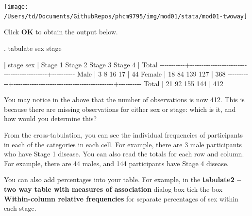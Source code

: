 \documentclass[
]{memoir}
\newenvironment{Shaded}{\begin{snugshade}}{\end{snugshade}}
\newcommand{\NormalTok}[1]{#1}
\begin{document}
\texttt{[image: /Users/td/Documents/GithubRepos/phcm9795/img/mod01/stata/mod01-twoway]}

Click \textbf{OK} to obtain the output below.

\begin{Shaded}
\begin{Highlighting}[]
\NormalTok{. tabulate sex stage}

\NormalTok{           |                    stage}
\NormalTok{       sex |   Stage 1    Stage 2    Stage 3    Stage 4 |     Total}
\NormalTok{{-}{-}{-}{-}{-}{-}{-}{-}{-}{-}{-}+{-}{-}{-}{-}{-}{-}{-}{-}{-}{-}{-}{-}{-}{-}{-}{-}{-}{-}{-}{-}{-}{-}{-}{-}{-}{-}{-}{-}{-}{-}{-}{-}{-}{-}{-}{-}{-}{-}{-}{-}{-}{-}{-}{-}+{-}{-}{-}{-}{-}{-}{-}{-}{-}{-}}
\NormalTok{      Male |         3          8         16         17 |        44 }
\NormalTok{    Female |        18         84        139        127 |       368 }
\NormalTok{{-}{-}{-}{-}{-}{-}{-}{-}{-}{-}{-}+{-}{-}{-}{-}{-}{-}{-}{-}{-}{-}{-}{-}{-}{-}{-}{-}{-}{-}{-}{-}{-}{-}{-}{-}{-}{-}{-}{-}{-}{-}{-}{-}{-}{-}{-}{-}{-}{-}{-}{-}{-}{-}{-}{-}+{-}{-}{-}{-}{-}{-}{-}{-}{-}{-}}
\NormalTok{     Total |        21         92        155        144 |       412 }
\end{Highlighting}
\end{Shaded}

You may notice in the above that the number of observations is now 412. This is because there are missing observations for either sex or stage: which is it, and how would you determine this?

From the cross-tabulation, you can see the individual frequencies of participants in each of the categories in each cell. For example, there are 3 male participants who have Stage 1 disease. You can also read the totals for each row and column. For example, there are 44 males, and 144 participants have Stage 4 disease.

You can also add percentages into your table. For example, in the \textbf{tabulate2 -- two way table with measures of association} dialog box tick the box \textbf{Within-column relative frequencies} for separate percentages of sex within each stage.
\end{document}
